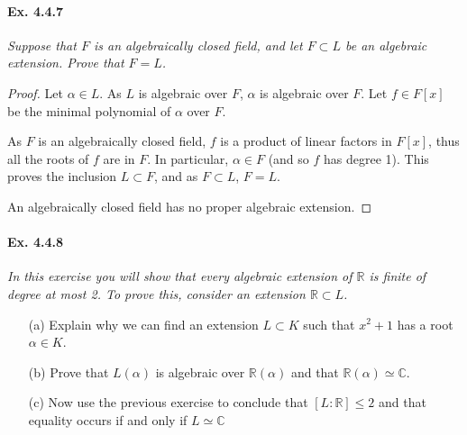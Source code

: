 \documentclass[11pt,a4paper]{article}
\newcommand{\R}{\mathbb{R}}
\newcommand{\C}{\mathbb{C}}
\begin{document}
\paragraph{Ex. 4.4.7} 

{\it Suppose that $F$ is an algebraically closed field, and let $F\subset L$ be an algebraic extension. Prove that $F=L$.
}

\begin{proof}
Let $\alpha \in L$. As $L$ is algebraic over $F$, $\alpha$ is algebraic over $F$. Let $f\in F[x]$ be the minimal polynomial of $\alpha$ over $F$.

As $F$ is an algebraically closed field, $f$ is a product of linear factors in $F[x]$, thus all the roots of $f$ are in $F$. In particular, $\alpha \in F$ (and so $f$ has degree 1). This proves the inclusion $L \subset F$, and as  $F \subset L$, $F=L$.

An algebraically closed field has no proper algebraic extension.
\end{proof}

\paragraph{Ex. 4.4.8}

{\it In this exercise you will show that every algebraic extension of $\R$ is finite of degree at most 2. To prove this, consider an extension $\R\subset L$.
\begin{enumerate}
\item[(a)] Explain why we can find an extension $L\subset K$ such that $x^2+1$ has a root $\alpha \in K$.
\item[(b)] Prove that $L(\alpha)$ is algebraic over $\R(\alpha)$ and that $\R(\alpha) \simeq \C$.
\item[(c)] Now use the previous exercise to conclude that $[L:\R] \leq 2$ and that equality occurs if and only if $L\simeq \C$
\end{enumerate}
}
\end{document}
